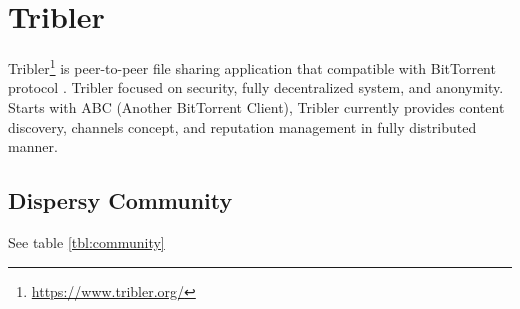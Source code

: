\section{Tribler}
Tribler\footnote{\url{https://www.tribler.org/}} is peer-to-peer file sharing application that compatible with BitTorrent protocol \cite{2008:tribler:pouwelse}. Tribler focused on security, fully decentralized system, and anonymity. Starts with ABC (Another BitTorrent Client), Tribler currently provides content discovery, channels concept, and reputation management in fully distributed manner.


\subsection{Dispersy Community}
See table \ref{tbl:community}

